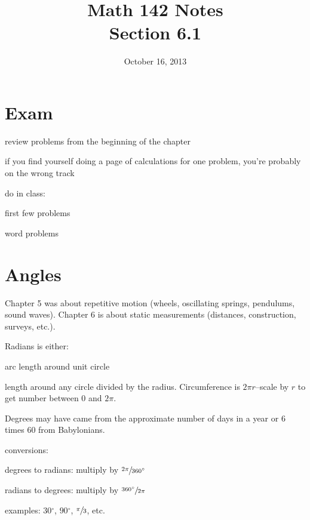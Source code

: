 \documentclass{exam}
\title{Math 142 Notes \\ Section 6.1}
\date{October 16, 2013}
\newcommand{\dg}{\ensuremath{^\circ}}
\begin{document}
  \maketitle
  \tableofcontents

  \section{Exam}
  \begin{itemize*}
    \item review problems from the beginning of the chapter
    \item if you find yourself doing a page of calculations for one problem, you're probably on the wrong track
    \item do in class: 
      \begin{itemize*}
        \item first few problems
        \item word problems
      \end{itemize*}
  \end{itemize*}

  \section{Angles}

  Chapter 5 was about repetitive motion (wheels, oscillating springs, pendulums, sound waves).  Chapter 6 is about
  static measurements (distances, construction, surveys, etc.).

  Radians is either:
  \begin{itemize*}
    \item arc length around unit circle
    \item length around any circle divided by the radius.  Circumference is $2 \pi r$--scale by $r$ to get number
      between $0$ and $2 \pi$.
  \end{itemize*}

  Degrees may have came from the approximate number of days in a year or 6 times 60 from Babylonians.

  conversions:
  \begin{itemize*}
    \item degrees to radians: multiply by $\sfrac{2 \pi}{360 \dg}$
    \item radians to degrees: multiply by $\sfrac{360 \dg}{2 \pi}$
  \end{itemize*}

  examples: $30\dg$, $90\dg$, $\sfrac{\pi}{3}$, etc.
\end{document}
